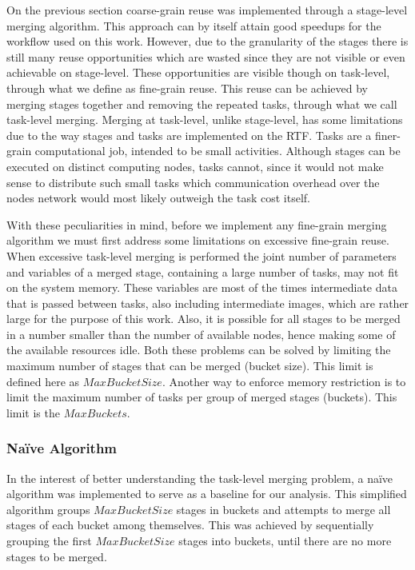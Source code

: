 On the previous section coarse-grain reuse was implemented through a stage-level merging algorithm. This approach can by itself attain good speedups for the workflow used on this work. However, due to the granularity of the stages there is still many reuse opportunities which are wasted since they are not visible or even achievable on stage-level. These opportunities are visible though on task-level, through what we define as fine-grain reuse. This reuse can be achieved by merging stages together and removing the repeated tasks, through what we call task-level merging. Merging at task-level, unlike stage-level, has some limitations due to the way stages and tasks are implemented on the RTF. Tasks are a finer-grain computational job, intended to be small activities. Although stages can be executed on distinct computing nodes, tasks cannot, since it would not make sense to distribute such small tasks which communication overhead over the nodes network would most likely outweigh the task cost itself.

With these peculiarities in mind, before we implement any fine-grain merging algorithm we must first address some limitations on excessive fine-grain reuse. When excessive task-level merging is performed the joint number of parameters and variables of a merged stage, containing a large number of tasks, may not fit on the system memory. These variables are most of the times intermediate data that is passed between tasks, also including intermediate images, which are rather large for the purpose of this work. Also, it is possible for all stages to be merged in a number smaller than the number of available nodes, hence making some of the available resources idle. Both these problems can be solved by limiting the maximum number of stages that can be merged (bucket size). This limit is defined here as $MaxBucketSize$. Another way to enforce memory restriction is to limit the maximum number of tasks per group of merged stages (buckets). This limit is the $MaxBuckets$.

\subsubsection{Na\"ive Algorithm}
\label{sec:naive-merging}

In the interest of better understanding the task-level merging problem, a na\"ive algorithm was implemented to serve as a baseline for our analysis. This simplified algorithm groups $MaxBucketSize$ stages in buckets and attempts to merge all stages of each bucket among themselves. This was achieved by sequentially grouping the first $MaxBucketSize$ stages into buckets, until there are no more stages to be merged. 

